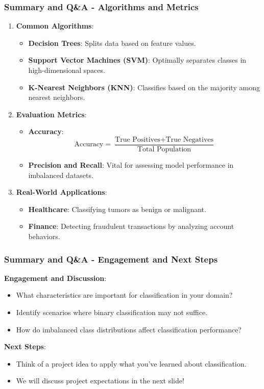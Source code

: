 \documentclass[aspectratio=169]{beamer}
\begin{document}
\begin{frame}[fragile]
    \frametitle{Summary and Q\&A - Algorithms and Metrics}
    \begin{enumerate}[resume]
        \item \textbf{Common Algorithms}:
        \begin{itemize}
            \item \textbf{Decision Trees}: Splits data based on feature values.
            \item \textbf{Support Vector Machines (SVM)}: Optimally separates classes in high-dimensional spaces.
            \item \textbf{K-Nearest Neighbors (KNN)}: Classifies based on the majority among nearest neighbors.
        \end{itemize}
        
        \item \textbf{Evaluation Metrics}:
        \begin{itemize}
            \item \textbf{Accuracy}:
            \begin{equation}
                \text{Accuracy} = \frac{\text{True Positives} + \text{True Negatives}}{\text{Total Population}}
            \end{equation}
            \item \textbf{Precision and Recall}: Vital for assessing model performance in imbalanced datasets.
        \end{itemize}

        \item \textbf{Real-World Applications}:
        \begin{itemize}
            \item \textbf{Healthcare}: Classifying tumors as benign or malignant.
            \item \textbf{Finance}: Detecting fraudulent transactions by analyzing account behaviors.
        \end{itemize}
    \end{enumerate}
\end{frame}

\begin{frame}[fragile]
    \frametitle{Summary and Q\&A - Engagement and Next Steps}
    \textbf{Engagement and Discussion}:
    \begin{itemize}
        \item What characteristics are important for classification in your domain?
        \item Identify scenarios where binary classification may not suffice.
        \item How do imbalanced class distributions affect classification performance?
    \end{itemize}

    \textbf{Next Steps}:
    \begin{itemize}
        \item Think of a project idea to apply what you've learned about classification.
        \item We will discuss project expectations in the next slide!
    \end{itemize}
\end{frame}
\end{document}

